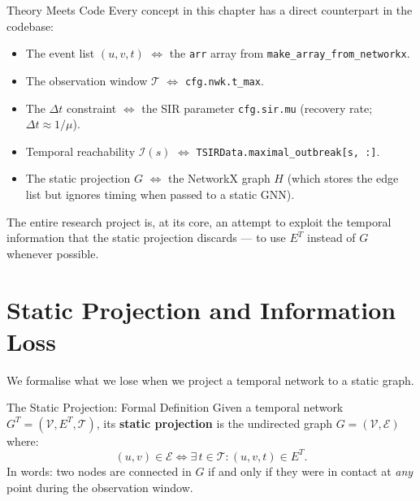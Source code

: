 \begin{keyinsight}{Theory Meets Code}
Every concept in this chapter has a direct counterpart in the codebase:
\begin{itemize}[noitemsep]
  \item The event list $(u, v, t)$ $\Leftrightarrow$ the \texttt{arr} array from
        \texttt{make\_array\_from\_networkx}.
  \item The observation window $\mathcal{T}$ $\Leftrightarrow$ \texttt{cfg.nwk.t\_max}.
  \item The $\Delta t$ constraint $\Leftrightarrow$ the SIR parameter \texttt{cfg.sir.mu}
        (recovery rate; $\Delta t \approx 1/\mu$).
  \item Temporal reachability $\mathcal{I}(s)$ $\Leftrightarrow$
        \texttt{TSIRData.maximal\_outbreak[s, :]}.
  \item The static projection $G$ $\Leftrightarrow$ the NetworkX graph $H$ (which stores the
        edge list but ignores timing when passed to a static GNN).
\end{itemize}
The entire research project is, at its core, an attempt to exploit the temporal information
that the static projection discards --- to use $E^T$ instead of $G$ whenever possible.
\end{keyinsight}

\section{Static Projection and Information Loss}
\label{sec:static_projection}

We formalise what we lose when we project a temporal network to a static graph.

\begin{mathbox}{The Static Projection: Formal Definition}
Given a temporal network $G^T = (\mathcal{V}, E^T, \mathcal{T})$, its \textbf{static
projection} is the undirected graph $G = (\mathcal{V}, \mathcal{E})$ where:
\[
  (u, v) \in \mathcal{E} \iff \exists\, t \in \mathcal{T} : (u, v, t) \in E^T.
\]
In words: two nodes are connected in $G$ if and only if they were in contact at
\textit{any} point during the observation window.
\end{mathbox}

